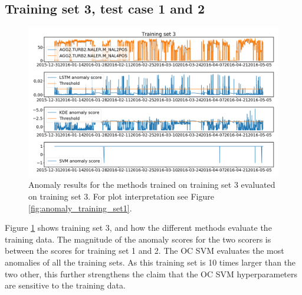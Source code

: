         
    
    \subsection{Training set 3, test case 1 and 2}
        \begin{figure}
            \centering
            \includegraphics[width=\textwidth]{report/figures/analysis/plant2_train_long/training_data_anomaly.png}
            \caption{Anomaly results for the methods trained on training set 3 evaluated on training set 3. For plot interpretation see Figure \ref{fig:anomaly_training_set1}.}
            \label{fig:anomaly_training_set3}
        \end{figure}
        Figure \ref{fig:anomaly_training_set3} shows training set 3, and how the different methods evaluate the training data. The magnitude of the anomaly scores for the two scorers is between the scores for training set 1 and 2.  The OC SVM evaluates the most anomalies of all the training sets. As this training set is 10 times larger than the two other, this further strengthens the claim that the OC SVM hyperparameters are sensitive to the training data. 
    

